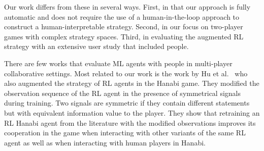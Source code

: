 \documentclass[letterpaper]{article} %
\begin{document}
Our work differs from these in several ways. First, in that our  approach is fully automatic and does not require the use of   a human-in-the-loop approach to construct a human-interpretable strategy. Second, in our focus on two-player games with complex strategy spaces. Third, in  evaluating  the augmented RL strategy with an extensive  user study that included people.  



There are few works that evaluate ML agents with people in multi-player collaborative 
settings. Most related to our work is the work by Hu et al.~ who also  augmented 
the strategy of RL agents in the Hanabi game. They modified the observation sequence of the RL agent in the presence of symmetrical signals during training. Two signals are symmetric if they  contain different statements  but with equivalent information value to the player.
They show that retraining an RL Hanabi  agent from the literature   with the modified observations improves its cooperation in the game when interacting with other variants of the same RL agent as well as when interacting with human players in Hanabi.
\end{document}
